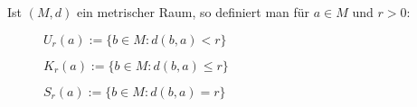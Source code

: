 Ist $(M, d)$ ein metrischer Raum, so definiert man für $a \in M$ und $r > 0$:
\begin{description}
    \item[] $U_r(a) := \{ b \in M: d(b, a) < r \}$
    \item[] $K_r(a) := \{ b \in M: d(b, a) \leq r \}$
    \item[] $S_r(a) := \{ b \in M: d(b, a) = r \}$
\end{description}